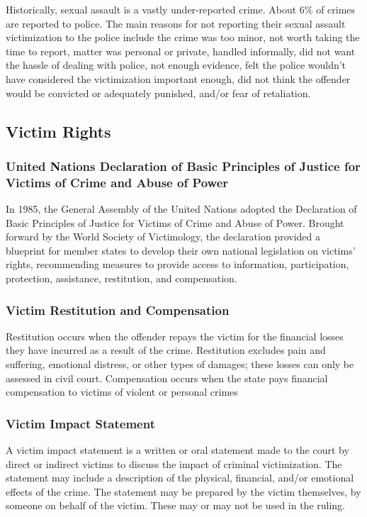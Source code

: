 \documentclass{article}
\begin{document}
Historically, sexual assault is a vastly under-reported crime. About 6\% of crimes are reported to police. The main reasons for not reporting their sexual assault victimization to the police include the crime was too minor, not worth taking the time to report, matter was personal or private, handled informally, did not want the hassle of dealing with police, not enough evidence, felt the police wouldn’t have considered the victimization important enough, did not think the offender would be convicted or adequately punished, and/or fear of retaliation.

\subsection{Victim Rights}

\subsubsection*{United Nations Declaration of Basic Principles of Justice for Victims of Crime and Abuse of Power}

In 1985, the General Assembly of the United Nations adopted the Declaration of Basic Principles of Justice for Victims of Crime and Abuse of Power. Brought forward by the World Society of Victimology, the declaration provided a blueprint for member states to develop their own national legislation on victims’ rights, recommending measures to provide access to information, participation, protection, assistance, restitution, and compensation.

\subsubsection*{Victim Restitution and Compensation}

Restitution occurs when the offender repays the victim for the financial losses they have incurred as a result of the crime. Restitution excludes pain and suffering, emotional distress, or other types of damages; these losses can only be assessed in civil court. Compensation occurs when the state pays financial compensation to victims of violent or personal crimes

\subsubsection*{Victim Impact Statement}

A victim impact statement is a written or oral statement made to the court by direct or indirect victims to discuss the impact of criminal victimization. The statement may include a description of the physical, financial, and/or emotional effects of the crime. The statement may be prepared by the victim themselves, by someone on behalf of the victim. These may or may not be used in the ruling.
\end{document}

